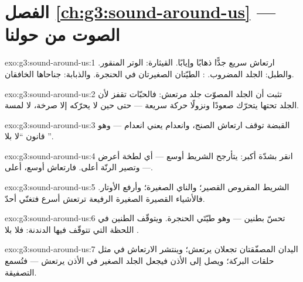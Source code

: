 \section*{الفصل \ref{ch:g3:sound-around-us} --- الصوت من حولنا}

\begin{solution}{exo:g3:sound-around-us:1}
ارتعاش سريع جدًّا ذهابًا وإيابًا. القيثارة: الوتر المنقور.
والطبل: الجلد المضروب. : الطيّتان الصغيرتان في الحنجرة.
والذبابة: جناحاها الخافقان.
\end{solution}

\begin{solution}{exo:g3:sound-around-us:2}
تثبت أن الجلد المصوّت جلد مرتعش: فالحبّات تقفز لأن الجلد تحتها
يتحرّك صعودًا ونزولًا حركة سريعة --- حتى حين لا يحرّكه إلا
صرخة، لا لمسة.
\end{solution}

\begin{solution}{exo:g3:sound-around-us:3}
القبضة توقف ارتعاش الصنج، وانعدام  يعني انعدام 
--- وهو قانون ``لا  بلا ''.
\end{solution}

\begin{solution}{exo:g3:sound-around-us:4}
انقر بشدّة أكبر: يتأرجح الشريط أوسع --- أي لطخة أعرض --- وتصير
الرنّة أعلى. فارتعاش أوسع،  أعلى.
\end{solution}

\begin{solution}{exo:g3:sound-around-us:5}
الشريط المقروص القصير؛ والناي الصغيرة؛ وأرفع الأوتار. فالأشياء
القصيرة الصغيرة الرفيعة ترتعش أسرع فتغنّي أحدّ.
\end{solution}

\begin{solution}{exo:g3:sound-around-us:6}
تحسّ بطنين --- وهو  طيّتَي الحنجرة. ويتوقّف الطنين في
اللحظة التي تتوقّف فيها الدندنة: فلا  بلا .
\end{solution}

\begin{solution}{exo:g3:sound-around-us:7}
اليدان المصفّقتان تجعلان  يرتعش؛ وينتشر الارتعاش في
 مثل حلقات البركة؛ ويصل إلى الأذن فيجعل الجلد الصغير في
الأذن يرتعش --- فتُسمع التصفيقة.
\end{solution}

